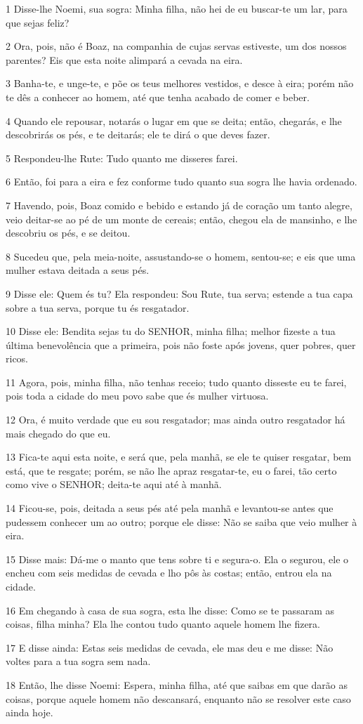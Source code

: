\par 1 Disse-lhe Noemi, sua sogra: Minha filha, não hei de eu buscar-te um lar, para que sejas feliz?
\par 2 Ora, pois, não é Boaz, na companhia de cujas servas estiveste, um dos nossos parentes? Eis que esta noite alimpará a cevada na eira.
\par 3 Banha-te, e unge-te, e põe os teus melhores vestidos, e desce à eira; porém não te dês a conhecer ao homem, até que tenha acabado de comer e beber.
\par 4 Quando ele repousar, notarás o lugar em que se deita; então, chegarás, e lhe descobrirás os pés, e te deitarás; ele te dirá o que deves fazer.
\par 5 Respondeu-lhe Rute: Tudo quanto me disseres farei.
\par 6 Então, foi para a eira e fez conforme tudo quanto sua sogra lhe havia ordenado.
\par 7 Havendo, pois, Boaz comido e bebido e estando já de coração um tanto alegre, veio deitar-se ao pé de um monte de cereais; então, chegou ela de mansinho, e lhe descobriu os pés, e se deitou.
\par 8 Sucedeu que, pela meia-noite, assustando-se o homem, sentou-se; e eis que uma mulher estava deitada a seus pés.
\par 9 Disse ele: Quem és tu? Ela respondeu: Sou Rute, tua serva; estende a tua capa sobre a tua serva, porque tu és resgatador.
\par 10 Disse ele: Bendita sejas tu do SENHOR, minha filha; melhor fizeste a tua última benevolência que a primeira, pois não foste após jovens, quer pobres, quer ricos.
\par 11 Agora, pois, minha filha, não tenhas receio; tudo quanto disseste eu te farei, pois toda a cidade do meu povo sabe que és mulher virtuosa.
\par 12 Ora, é muito verdade que eu sou resgatador; mas ainda outro resgatador há mais chegado do que eu.
\par 13 Fica-te aqui esta noite, e será que, pela manhã, se ele te quiser resgatar, bem está, que te resgate; porém, se não lhe apraz resgatar-te, eu o farei, tão certo como vive o SENHOR; deita-te aqui até à manhã.
\par 14 Ficou-se, pois, deitada a seus pés até pela manhã e levantou-se antes que pudessem conhecer um ao outro; porque ele disse: Não se saiba que veio mulher à eira.
\par 15 Disse mais: Dá-me o manto que tens sobre ti e segura-o. Ela o segurou, ele o encheu com seis medidas de cevada e lho pôs às costas; então, entrou ela na cidade.
\par 16 Em chegando à casa de sua sogra, esta lhe disse: Como se te passaram as coisas, filha minha? Ela lhe contou tudo quanto aquele homem lhe fizera.
\par 17 E disse ainda: Estas seis medidas de cevada, ele mas deu e me disse: Não voltes para a tua sogra sem nada.
\par 18 Então, lhe disse Noemi: Espera, minha filha, até que saibas em que darão as coisas, porque aquele homem não descansará, enquanto não se resolver este caso ainda hoje.

